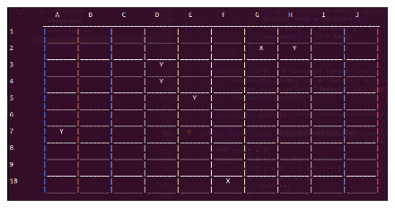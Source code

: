 \documentclass{article}
\begin{document}
	\begin{figure}[H]
		\centering
		\includegraphics[width=1.0\textwidth,keepaspectratio]{img/Commit9.png}
	\end{figure}
\end{document}
